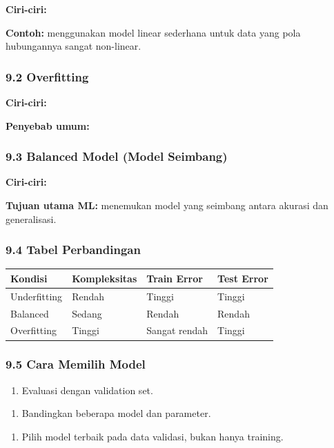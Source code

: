 \documentclass[12pt,a4paper]{article}
\begin{document}
\textbf{Ciri-ciri:}


\textbf{Contoh:} menggunakan model linear sederhana untuk data yang pola hubungannya sangat non-linear.


\subsubsection{9.2 Overfitting}

\textbf{Ciri-ciri:}


\textbf{Penyebab umum:}


\subsubsection{9.3 Balanced Model (Model Seimbang)}

\textbf{Ciri-ciri:}


\textbf{Tujuan utama ML:} menemukan model yang seimbang antara akurasi dan generalisasi.


\subsubsection{9.4 Tabel Perbandingan}

\begin{tabular}{|l|l|l|l|}
\hline
Kondisi & Kompleksitas & Train Error & Test Error \\
\hline
Underfitting & Rendah & Tinggi & Tinggi \\
\hline
Balanced & Sedang & Rendah & Rendah \\
\hline
Overfitting & Tinggi & Sangat rendah & Tinggi \\
\hline
\end{tabular}


\subsubsection{9.5 Cara Memilih Model}

\begin{enumerate}
\item Evaluasi dengan validation set.
\end{enumerate}

\begin{enumerate}
\item Bandingkan beberapa model dan parameter.
\end{enumerate}

\begin{enumerate}
\item Pilih model terbaik pada data validasi, bukan hanya training.
\end{enumerate}
\end{document}

